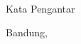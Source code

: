 \chapter*{\kataPengantar}
Kata Pengantar

 
\vspace*{0.1cm}
\begin{flushright}
Bandung, \tanggalPengesahan\\[0.1cm]
\vspace*{1cm}
\penulis

\end{flushright}